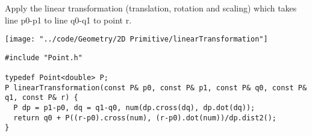 \begin{minipage}{75mm}
Apply the linear transformation (translation, rotation and scaling) which takes line p0-p1 to line q0-q1 to point r.
\end{minipage}
\begin{minipage}{15mm}
\vspace{-8mm}
\texttt{[image: "../code/Geometry/2D Primitive/linearTransformation"]}
\vspace{-2mm}
\end{minipage}
\begin{verbatim}
#include "Point.h"

typedef Point<double> P;
P linearTransformation(const P& p0, const P& p1, const P& q0, const P& q1, const P& r) {
  P dp = p1-p0, dq = q1-q0, num(dp.cross(dq), dp.dot(dq));
  return q0 + P((r-p0).cross(num), (r-p0).dot(num))/dp.dist2();
}
\end{verbatim}